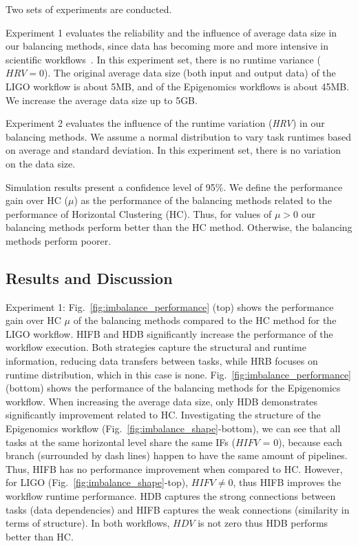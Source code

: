 Two sets of experiments are conducted. 

Experiment 1 evaluates the reliability and the influence of average data size in our balancing methods, since data has becoming more and more intensive in scientific workflows~\cite{Juve2013}. In this experiment set, there is no runtime variance ($HRV = 0$). The original average data size (both input and output data) of the LIGO workflow is about 5MB, and of the Epigenomics workflows is about 45MB. We increase the average data size up to 5GB.

Experiment 2 evaluates the influence of the runtime variation (\emph{HRV}) in our balancing methods. We assume a normal distribution to vary task runtimes based on average and standard deviation. In this experiment set, there is no variation on the data size.

Simulation results present a confidence level of 95\%. We define the performance gain over HC ($\mu$) as the performance of the balancing methods related to the performance of Horizontal Clustering (HC). Thus, for values of $\mu > 0$ our balancing methods perform better than the HC method. Otherwise, the balancing methods perform poorer.

\subsection{Results and Discussion}


Experiment 1: Fig.~\ref{fig:imbalance_performance} (top) shows the performance gain over HC $\mu$ of the balancing methods compared to the HC method for the LIGO workflow. HIFB and HDB significantly increase the performance of the workflow execution. Both strategies capture the structural and runtime information, reducing data transfers between tasks, while HRB focuses on runtime distribution, which in this case is none. Fig.~\ref{fig:imbalance_performance} (bottom) shows the performance of the balancing methods for the Epigenomics workflow. When increasing the average data size, only HDB demonstrates significantly improvement related to HC. Investigating the structure of the Epigenomics workflow (Fig.~\ref{fig:imbalance_shape}-bottom), we can see that all tasks at the same horizontal level share the same IFs ($HIFV$ = 0), because each branch (surrounded by dash lines) happen to have the same amount of pipelines. Thus, HIFB has no performance improvement when compared to HC. However, for LIGO (Fig.~\ref{fig:imbalance_shape}-top), $HIFV \neq 0$, thus HIFB improves the workflow runtime performance.  
HDB captures the strong connections between tasks (data dependencies) and HIFB captures the weak connections (similarity in terms of structure). In both workflows, $HDV$ is not zero thus HDB performs better than HC. 

